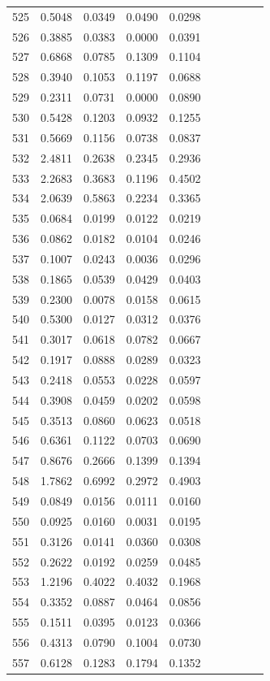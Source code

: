 \begin{table}
\begin{tabular}{cccccccccc}
525& 0.5048& 0.0349& 0.0490& 0.0298\\ 
526& 0.3885& 0.0383& 0.0000& 0.0391\\ 
527& 0.6868& 0.0785& 0.1309& 0.1104\\ 
528& 0.3940& 0.1053& 0.1197& 0.0688\\ 
529& 0.2311& 0.0731& 0.0000& 0.0890\\ 
530& 0.5428& 0.1203& 0.0932& 0.1255\\ 
531& 0.5669& 0.1156& 0.0738& 0.0837\\ 
532& 2.4811& 0.2638& 0.2345& 0.2936\\ 
533& 2.2683& 0.3683& 0.1196& 0.4502\\ 
534& 2.0639& 0.5863& 0.2234& 0.3365\\ 
535& 0.0684& 0.0199& 0.0122& 0.0219\\ 
536& 0.0862& 0.0182& 0.0104& 0.0246\\ 
537& 0.1007& 0.0243& 0.0036& 0.0296\\ 
538& 0.1865& 0.0539& 0.0429& 0.0403\\ 
539& 0.2300& 0.0078& 0.0158& 0.0615\\ 
540& 0.5300& 0.0127& 0.0312& 0.0376\\ 
541& 0.3017& 0.0618& 0.0782& 0.0667\\ 
542& 0.1917& 0.0888& 0.0289& 0.0323\\ 
543& 0.2418& 0.0553& 0.0228& 0.0597\\ 
544& 0.3908& 0.0459& 0.0202& 0.0598\\ 
545& 0.3513& 0.0860& 0.0623& 0.0518\\ 
546& 0.6361& 0.1122& 0.0703& 0.0690\\ 
547& 0.8676& 0.2666& 0.1399& 0.1394\\ 
548& 1.7862& 0.6992& 0.2972& 0.4903\\ 
549& 0.0849& 0.0156& 0.0111& 0.0160\\ 
550& 0.0925& 0.0160& 0.0031& 0.0195\\ 
551& 0.3126& 0.0141& 0.0360& 0.0308\\ 
552& 0.2622& 0.0192& 0.0259& 0.0485\\ 
553& 1.2196& 0.4022& 0.4032& 0.1968\\ 
554& 0.3352& 0.0887& 0.0464& 0.0856\\ 
555& 0.1511& 0.0395& 0.0123& 0.0366\\ 
556& 0.4313& 0.0790& 0.1004& 0.0730\\ 
557& 0.6128& 0.1283& 0.1794& 0.1352\\ 

\end{tabular}
\end{table}
